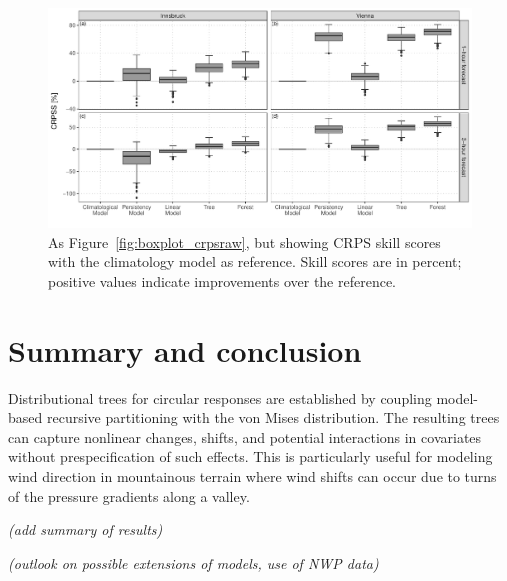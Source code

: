\documentclass[nojss]{jss}
\newcommand{\fixme}[1]{\emph{\marginpar{FIXME} (#1)}}
\numberwithin{equation}{section}
\begin{document}
\begin{figure}[t]
  \centering
  \includegraphics{_plot_circforest_validation_crpsskill_agg_comparison_with_lowff_v14b.pdf}
  \caption{As Figure~\ref{fig:boxplot_crpsraw}, but showing CRPS skill scores
    with the climatology model as reference. Skill scores are in percent; positive
    values indicate improvements over the reference.} 
  \label{fig:boxplot_crpsskill} 
\end{figure}


\section{Summary and conclusion}\label{sec:summary}
Distributional trees for circular responses are established by coupling
model-based recursive partitioning with the von Mises distribution.
The resulting trees can capture nonlinear changes, shifts, and potential interactions
in covariates without prespecification of such effects. This is particularly
useful for modeling wind direction in mountainous terrain where wind shifts
can occur due to turns of the pressure gradients along a valley.

\fixme{add summary of results}

\fixme{outlook on possible extensions of models, use of NWP data}

\end{document}
